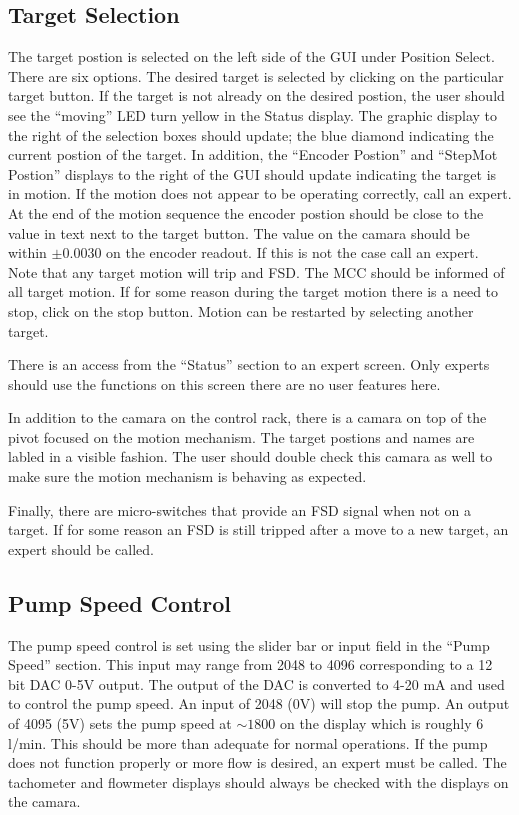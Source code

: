 \subsection{Target Selection}

The target postion is selected on the left side of the GUI under Position
Select. There are six options. The desired target is selected by clicking
on the particular target button. If the target is not already on the
desired postion, the user should see the {}``moving'' LED turn yellow
in the Status display. The graphic display to the right of the selection
boxes should update; the blue diamond indicating the current postion
of the target. In addition, the {}``Encoder Postion'' and {}``StepMot
Postion'' displays to the right of the GUI should update indicating
the target is in motion. If the motion does not appear to be operating
correctly, call an expert. At the end of the motion sequence the encoder
postion should be close to the value in text next to the target button.
The value on the camara should be within $\pm 0.0030$ on the encoder
readout. If this is not the case call an expert. Note that any target
motion will trip and FSD. The MCC should be informed of all target
motion. If for some reason during the target motion there is a need
to stop, click on the stop button. Motion can be restarted by selecting
another target.

There is an access from the {}``Status'' section to an expert screen.
Only experts should use the functions on this screen there are no
user features here.

In addition to the camara on the control rack, there is a camara on
top of the pivot focused on the motion mechanism. The target postions
and names are labled in a visible fashion. The user should double
check this camara as well to make sure the motion mechanism is behaving
as expected.

Finally, there are micro-switches that provide an FSD signal when
not on a target. If for some reason an FSD is still tripped after
a move to a new target, an expert should be called.


\subsection{Pump Speed Control}

The pump speed control is set using the slider bar or input field
in the {}``Pump Speed'' section. This input may range from 2048
to 4096 corresponding to a 12 bit DAC 0-5V output. The output of the
DAC is converted to 4-20 mA and used to control the pump speed. An
input of 2048 (0V) will stop the pump. An output of 4095 (5V) sets
the pump speed at $\sim 1800$ on the display which is roughly 6 l/min.
This should be more than adequate for normal operations. If the pump
does not function properly or more flow is desired, an expert must
be called. The tachometer and flowmeter displays should always be
checked with the displays on the camara.


